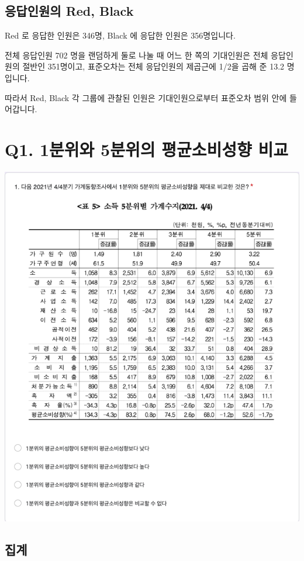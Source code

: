 \documentclass[
]{book}
\begin{document}
\subsection{응답인원의 Red, Black}\label{uxc751uxb2f5uxc778uxc6d0uxc758-red-black-11}

Red 로 응답한 인원은 346명, Black 에 응답한 인원은 356명입니다.

전체 응답인원 702 명을 랜덤하게 둘로 나눌 때 어느 한 쪽의 기대인원은 전체 응답인원의 절반인 351명이고, 표준오차는 전체 응답인원의 제곱근에 1/2을 곱해 준 13.2 명입니다.

따라서 Red, Black 각 그룹에 관찰된 인원은 기대인원으로부터 표준오차 범위 안에 들어갑니다.

\section{Q1. 1분위와 5분위의 평균소비성향 비교}\label{q1.-1uxbd84uxc704uxc640-5uxbd84uxc704uxc758-uxd3c9uxade0uxc18cuxbe44uxc131uxd5a5-uxbe44uxad50}

\includegraphics[width=0.75\linewidth]{./pics/Quiz230510_Q1}

\subsection{집계}\label{uxc9d1uxacc4-29}
\end{document}
